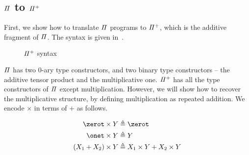 \subsection{$\mathit{\Pi}$ to $\mathit{{\Pi}^{+}}$}

First, we show how to translate $\mathit{\Pi}$ programs to $\mathit{{\Pi}^{+}}$, which is the additive fragment of $\mathit{\Pi}$. The
syntax is given in~.

\begin{figure}[t]
  {}

  {}
  \caption{$\mathit{{\Pi}^{+}}$ syntax}
  \label{fig:piplus}
\end{figure}

$\mathit{\Pi}$ has two 0-ary type constructors, and two binary type constructors -- the additive tensor product and the
multiplicative one. $\mathit{{\Pi}^{+}}$ has all the type constructors of $\mathit{\Pi}$ except multiplication. However, we will
show how to recover the multiplicative structure, by defining multiplication as repeated addition. We encode $\times$ in
terms of $+$ as follows.

\begin{definition}[$\times : \UPlus \to \UPlus \to \UPlus$]
  \begin{align*}
    \zerot \times Y      & \defeq \zerot                      \\
    \onet \times Y       & \defeq Y                           \\
    (X_1 + X_2) \times Y & \defeq X_1 \times Y + X_2 \times Y
  \end{align*}
\end{definition}

